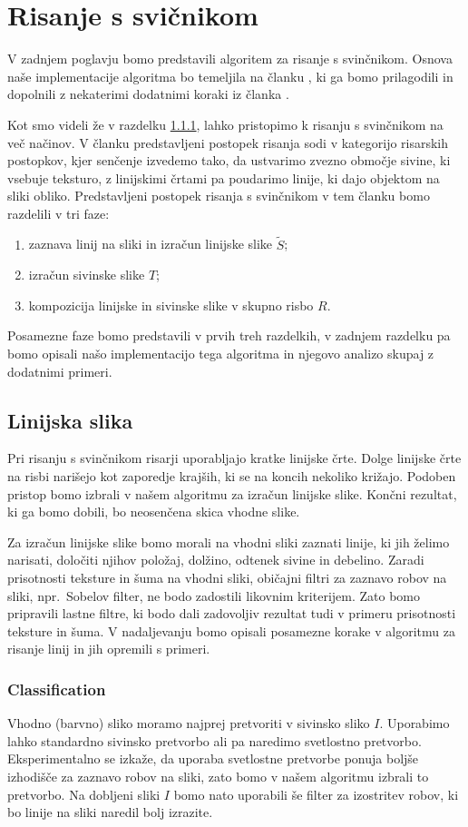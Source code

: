 \chapter{Risanje s svičnikom}
V zadnjem poglavju bomo predstavili algoritem za risanje s svinčnikom. Osnova naše implementacije algoritma bo temeljila na članku \cite{}, ki ga bomo prilagodili in dopolnili z nekaterimi dodatnimi koraki iz članka \cite{}.

Kot smo videli že v razdelku \ref{}, lahko pristopimo k risanju s svinčnikom na več načinov. V članku \cite{} predstavljeni postopek risanja sodi v kategorijo risarskih postopkov, kjer senčenje izvedemo tako, da ustvarimo zvezno območje sivine, ki vsebuje teksturo, z linijskimi črtami pa poudarimo linije, ki dajo objektom na sliki obliko. Predstavljeni postopek risanja s svinčnikom v tem članku bomo razdelili v tri faze:
%
\begin{enumerate}
  \item zaznava linij na sliki in izračun linijske slike $\tilde{S}$;
  \item izračun sivinske slike $T$;
  \item kompozicija linijske in sivinske slike v skupno risbo $R$.
\end{enumerate}
%
Posamezne faze bomo predstavili v prvih treh razdelkih, v zadnjem razdelku pa bomo opisali našo implementacijo tega algoritma in njegovo analizo skupaj z dodatnimi primeri.
%
\section{Linijska slika}
Pri risanju s svinčnikom risarji uporabljajo kratke linijske črte. Dolge linijske črte na risbi narišejo kot zaporedje krajših, ki se na koncih nekoliko križajo. Podoben pristop bomo izbrali v našem algoritmu za izračun linijske slike. Končni rezultat, ki ga bomo dobili, bo neosenčena skica vhodne slike.

Za izračun linijske slike bomo morali na vhodni sliki zaznati linije, ki jih želimo narisati, določiti njihov položaj, dolžino, odtenek sivine in debelino. Zaradi prisotnosti teksture in šuma na vhodni sliki, običajni filtri za zaznavo robov na sliki, npr.\  Sobelov filter, ne bodo zadostili likovnim kriterijem. Zato bomo pripravili lastne filtre, ki bodo dali zadovoljiv rezultat tudi v primeru prisotnosti teksture in šuma. V nadaljevanju bomo opisali posamezne korake v algoritmu za risanje linij in jih opremili s primeri.
%
\subsection{Classification}
Vhodno (barvno) sliko moramo najprej pretvoriti v sivinsko sliko $I$. Uporabimo lahko standardno sivinsko pretvorbo ali pa naredimo svetlostno pretvorbo. %
Eksperimentalno se izkaže, da uporaba svetlostne pretvorbe ponuja boljše izhodišče za zaznavo robov na sliki, zato bomo v našem algoritmu izbrali to pretvorbo. Na dobljeni sliki $I$ bomo nato uporabili še filter za izostritev robov, ki bo linije na sliki naredil bolj izrazite.

